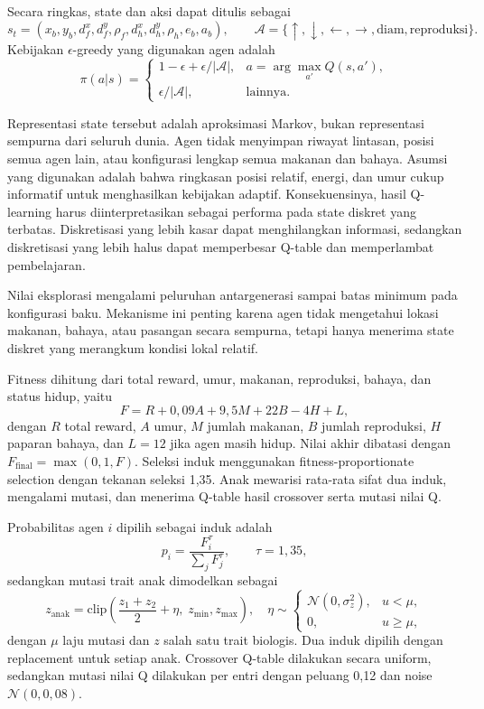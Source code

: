 \documentclass[10pt]{article}
\begin{document}
Secara ringkas, state dan aksi dapat ditulis sebagai
\[
s_t=(x_b,y_b,d^x_f,d^y_f,\rho_f,d^x_h,d^y_h,\rho_h,e_b,a_b), \qquad
\mathcal{A}=\{\uparrow,\downarrow,\leftarrow,\rightarrow,\mathrm{diam},\mathrm{reproduksi}\}.
\]
Kebijakan $\epsilon$-greedy yang digunakan agen adalah
\[
\pi(a|s)=
\begin{cases}
1-\epsilon+\epsilon/|\mathcal{A}|, & a=\arg\max_{a'}Q(s,a'),\\
\epsilon/|\mathcal{A}|, & \text{lainnya}.
\end{cases}
\]

Representasi state tersebut adalah aproksimasi Markov, bukan representasi sempurna dari seluruh dunia. Agen tidak menyimpan riwayat lintasan, posisi semua agen lain, atau konfigurasi lengkap semua makanan dan bahaya. Asumsi yang digunakan adalah bahwa ringkasan posisi relatif, energi, dan umur cukup informatif untuk menghasilkan kebijakan adaptif. Konsekuensinya, hasil Q-learning harus diinterpretasikan sebagai performa pada state diskret yang terbatas. Diskretisasi yang lebih kasar dapat menghilangkan informasi, sedangkan diskretisasi yang lebih halus dapat memperbesar Q-table dan memperlambat pembelajaran.

Nilai eksplorasi mengalami peluruhan antargenerasi sampai batas minimum pada konfigurasi baku. Mekanisme ini penting karena agen tidak mengetahui lokasi makanan, bahaya, atau pasangan secara sempurna, tetapi hanya menerima state diskret yang merangkum kondisi lokal relatif.

Fitness dihitung dari total reward, umur, makanan, reproduksi, bahaya, dan status hidup, yaitu
\[
F = R + 0{,}09A + 9{,}5M + 22B - 4H + L,
\]
dengan $R$ total reward, $A$ umur, $M$ jumlah makanan, $B$ jumlah reproduksi, $H$ paparan bahaya, dan $L=12$ jika agen masih hidup. Nilai akhir dibatasi dengan $F_{\mathrm{final}}=\max(0{,}1,F)$. Seleksi induk menggunakan fitness-proportionate selection dengan tekanan seleksi 1,35. Anak mewarisi rata-rata sifat dua induk, mengalami mutasi, dan menerima Q-table hasil crossover serta mutasi nilai Q.

Probabilitas agen $i$ dipilih sebagai induk adalah
\[
p_i=\frac{F_i^\tau}{\sum_j F_j^\tau}, \qquad \tau=1{,}35,
\]
sedangkan mutasi trait anak dimodelkan sebagai
\[
z_{\mathrm{anak}}=\mathrm{clip}\!\left(\frac{z_1+z_2}{2}+\eta,\;z_{\min},z_{\max}\right), \quad
\eta\sim \begin{cases}\mathcal{N}(0,\sigma_z^2),& u<\mu,\\0,&u\geq\mu,\end{cases}
\]
dengan $\mu$ laju mutasi dan $z$ salah satu trait biologis. Dua induk dipilih dengan replacement untuk setiap anak. Crossover Q-table dilakukan secara uniform, sedangkan mutasi nilai Q dilakukan per entri dengan peluang 0,12 dan noise $\mathcal{N}(0,0{,}08)$.
\end{document}
